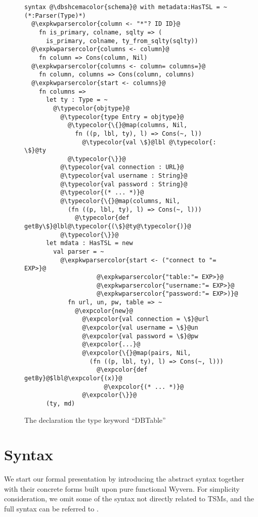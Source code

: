 \documentclass{sig-alternate}
\newcommand{\expkwparsercolor}[1]{\textcolor[HTML]{336699}{#1}}
\newcommand{\expcolor}[1]{\textcolor[HTML]{FF0033}{#1}}
\newcommand{\typecolor}[1]{\textcolor[HTML]{660066}{#1}}
\newcommand{\dbshcemacolor}[1]{\textcolor[HTML]{5AC3D1}{#1}}
\newcommand{\mycaption}[1]{\vspace{-4px}\caption{#1}\vspace{-2px}}
\begin{document}
\begin{figure}[t]
\begin{lstlisting}[style=wyvern]
syntax @\dbshcemacolor{schema}@ with metadata:HasTSL = ~ (*:Parser(Type)*)
  @\expkwparsercolor{column <- "*"? ID ID}@
    fn is_primary, colname, sqlty => (
      is_primary, colname, ty_from_sqlty(sqlty))
  @\expkwparsercolor{columns <- column}@
    fn column => Cons(column, Nil)
  @\expkwparsercolor{columns <- column= columns=}@
    fn column, columns => Cons(column, columns)
  @\expkwparsercolor{start <- columns}@
    fn columns =>
      let ty : Type = ~
        @\typecolor{objtype}@
          @\typecolor{type Entry = objtype}@
            @\typecolor{\{}@map(columns, Nil, 
              fn ((p, lbl, ty), l) => Cons(~, l))
                @\typecolor{val \$}@lbl @\typecolor{:  \$}@ty
            @\typecolor{\}}@
          @\typecolor{val connection : URL}@
          @\typecolor{val username : String}@
          @\typecolor{val password : String}@
          @\typecolor{(* ... *)}@
          @\typecolor{\{}@map(columns, Nil, 
            (fn ((p, lbl, ty), l) => Cons(~, l)))
              @\typecolor{def getBy\$}@lbl@\typecolor{(\$}@ty@\typecolor{)}@
          @\typecolor{\}}@
      let mdata : HasTSL = new 
        val parser = ~
          @\expkwparsercolor{start <- ("connect to "= EXP>}@
                    @\expkwparsercolor{"table:"= EXP>}@
                    @\expkwparsercolor{"username:"= EXP>}@
                    @\expkwparsercolor{"password:"= EXP>)}@
            fn url, un, pw, table => ~
              @\expcolor{new}@ 
                @\expcolor{val connection = \$}@url
                @\expcolor{val username = \$}@un
                @\expcolor{val password = \$}@pw
                @\expcolor{...}@
                @\expcolor{\{}@map(pairs, Nil, 
                  (fn ((p, lbl, ty), l) => Cons(~, l)))
                    @\expcolor{def getBy}@$lbl@\expcolor{(x)}@ 
                      @\expcolor{(* ... *)}@
                @\expcolor{\}}@
      (ty, md)
\end{lstlisting}
\mycaption{The declaration the type keyword ``DBTable''}
\label{typekw-example-1}
\end{figure}

\section{Syntax}\label{theory}
We start our formal presentation by introducing the abstract syntax together with their concrete forms built upon pure functional Wyvern. For simplicity consideration, we omit some of the syntax not directly related to TSMs, and the full syntax can be referred to .
\end{document}
